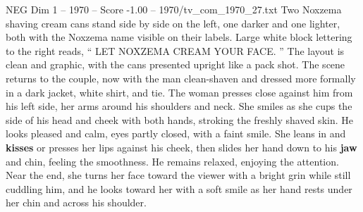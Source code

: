 \begin{textsample}{NEG Dim 1 – 1970 – Score -1.00 – 1970/tv\_com\_1970\_27.txt}
Two Noxzema shaving cream cans stand side by side on the left, one darker and one lighter, both with the Noxzema name visible on their labels.
Large white block lettering to the right reads, “ LET NOXZEMA CREAM YOUR FACE. ” The layout is clean and graphic, with the cans presented upright like a pack shot.
The scene returns to the couple, now with the man clean-shaven and dressed more formally in a dark jacket, white shirt, and tie.
The woman presses close against him from his left side, her arms around his shoulders and neck.
She smiles as she cups the side of his head and cheek with both hands, stroking the freshly shaved skin.
He looks pleased and calm, eyes partly closed, with a faint smile.
She leans in and \textbf{kisses} or presses her lips against his cheek, then slides her hand down to his \textbf{jaw} and chin, feeling the smoothness.
He remains relaxed, enjoying the attention.
Near the end, she turns her face toward the viewer with a bright grin while still cuddling him, and he looks toward her with a soft smile as her hand rests under her chin and across his shoulder.

\end{textsample}
